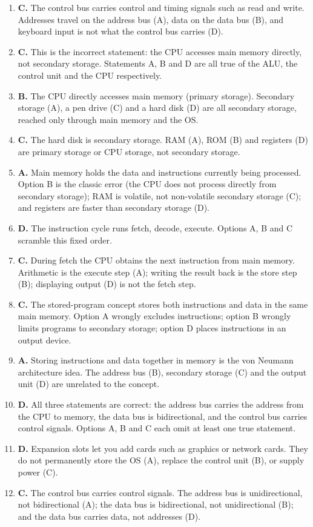 \documentclass[11pt]{article}
\begin{document}
\begin{enumerate}[label=\textbf{Q\arabic*.}, leftmargin=*]
  carries control signals, and there is no separate ``power bus'' in this
  three-bus model (D).
\item \textbf{C.} The control bus carries control and timing signals such as
  read and write. Addresses travel on the address bus (A), data on the data
  bus (B), and keyboard input is not what the control bus carries (D).
\item \textbf{C.} This is the incorrect statement: the CPU accesses main
  memory directly, not secondary storage. Statements A, B and D are all true
  of the ALU, the control unit and the CPU respectively.
\item \textbf{B.} The CPU directly accesses main memory (primary storage).
  Secondary storage (A), a pen drive (C) and a hard disk (D) are all
  secondary storage, reached only through main memory and the OS.
\item \textbf{C.} The hard disk is secondary storage. RAM (A), ROM (B) and
  registers (D) are primary storage or CPU storage, not secondary storage.
\item \textbf{A.} Main memory holds the data and instructions currently being
  processed. Option B is the classic error (the CPU does not process directly
  from secondary storage); RAM is volatile, not non-volatile secondary storage
  (C); and registers are faster than secondary storage (D).
\item \textbf{D.} The instruction cycle runs fetch, decode, execute. Options
  A, B and C scramble this fixed order.
\item \textbf{C.} During fetch the CPU obtains the next instruction from main
  memory. Arithmetic is the execute step (A); writing the result back is the
  store step (B); displaying output (D) is not the fetch step.
\item \textbf{C.} The stored-program concept stores both instructions and data
  in the same main memory. Option A wrongly excludes instructions; option B
  wrongly limits programs to secondary storage; option D places instructions
  in an output device.
\item \textbf{A.} Storing instructions and data together in memory is the von
  Neumann architecture idea. The address bus (B), secondary storage (C) and
  the output unit (D) are unrelated to the concept.
\item \textbf{D.} All three statements are correct: the address bus carries
  the address from the CPU to memory, the data bus is bidirectional, and the
  control bus carries control signals. Options A, B and C each omit at least
  one true statement.
\item \textbf{D.} Expansion slots let you add cards such as graphics or
  network cards. They do not permanently store the OS (A), replace the
  control unit (B), or supply power (C).
\item \textbf{C.} The control bus carries control signals. The address bus is
  unidirectional, not bidirectional (A); the data bus is bidirectional, not
  unidirectional (B); and the data bus carries data, not addresses (D).


\end{enumerate}
\end{document}
